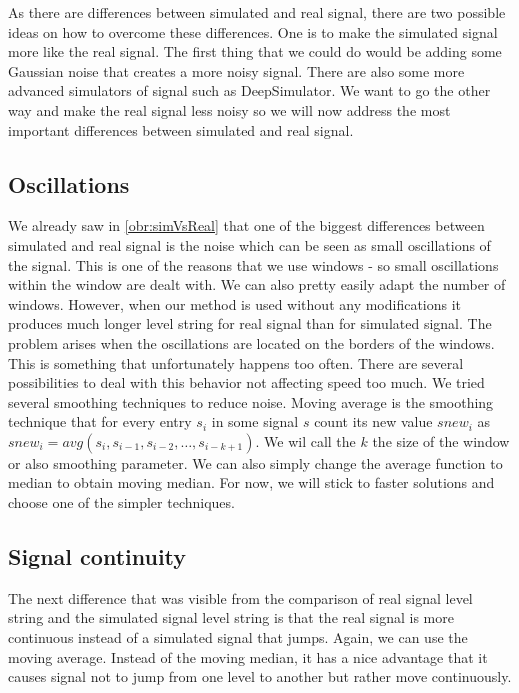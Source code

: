 As there are differences between simulated and real signal, there are two possible
ideas on how to overcome these differences. One is to make the simulated signal more like
the real signal. The first thing that we could do would be adding some Gaussian noise
that creates a more noisy signal. There are also some more advanced simulators of
signal such as DeepSimulator\cite{deepsimulator}. We want to go the other way and make the real signal
less noisy so we will now address the most important differences between simulated and real signal.

\subsection{Oscillations}

We already saw in \ref{obr:simVsReal} that one of the biggest differences between simulated and
real signal is the noise which can be seen as small oscillations of the signal. This is
one of the reasons that we use windows - so small oscillations within the window
are dealt with. We can also pretty easily adapt the number of windows.
However, when our method is used without any modifications it
produces much longer level string for real signal than for simulated signal.
The problem arises when the oscillations are located on the borders of the windows.
This is something that unfortunately happens too often.
There are several possibilities to deal with this behavior not affecting speed too
much. We tried several smoothing techniques to reduce noise. Moving average is the
smoothing technique that for every entry $s_i$ in some signal $s$ count its new value
$snew_i$ as $snew_i = avg(s_{i}, s_{i-1}, s_{i-2}, \dots , s_{i-k+1})$. We wil call the
$k$ the size of the window or also smoothing parameter. We can also simply change
the average function to median to obtain moving median. For now, we will stick
to faster solutions and choose one of the simpler techniques.

\subsection{Signal continuity}

The next difference that was visible from the comparison of real signal level string
and the simulated signal level string is that the real signal is more continuous instead
of a simulated signal that jumps. Again, we can use the moving average. Instead of
the moving median, it has a nice advantage that it causes signal not to jump from
one level to another but rather move continuously.

